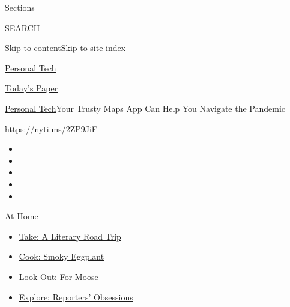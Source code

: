 Sections

SEARCH

\protect\hyperlink{site-content}{Skip to
content}\protect\hyperlink{site-index}{Skip to site index}

\href{https://www.nytimes3xbfgragh.onion/section/technology/personaltech}{Personal
Tech}

\href{https://myaccount.nytimes3xbfgragh.onion/auth/login?response_type=cookie\&client_id=vi}{}

\href{https://www.nytimes3xbfgragh.onion/section/todayspaper}{Today's
Paper}

\href{/section/technology/personaltech}{Personal Tech}\textbar{}Your
Trusty Maps App Can Help You Navigate the Pandemic

\url{https://nyti.ms/2ZP9JiF}

\begin{itemize}
\item
\item
\item
\item
\item
\end{itemize}

\href{https://www.nytimes3xbfgragh.onion/spotlight/at-home?action=click\&pgtype=Article\&state=default\&region=TOP_BANNER\&context=at_home_menu}{At
Home}

\begin{itemize}
\tightlist
\item
  \href{https://www.nytimes3xbfgragh.onion/2020/07/28/books/time-for-a-literary-road-trip.html?action=click\&pgtype=Article\&state=default\&region=TOP_BANNER\&context=at_home_menu}{Take:
  A Literary Road Trip}
\item
  \href{https://www.nytimes3xbfgragh.onion/2020/07/29/magazine/bored-with-your-home-cooking-some-smoky-eggplant-will-fix-that.html?action=click\&pgtype=Article\&state=default\&region=TOP_BANNER\&context=at_home_menu}{Cook:
  Smoky Eggplant}
\item
  \href{https://www.nytimes3xbfgragh.onion/2020/07/27/travel/moose-michigan-isle-royale.html?action=click\&pgtype=Article\&state=default\&region=TOP_BANNER\&context=at_home_menu}{Look
  Out: For Moose}
\item
  \href{https://www.nytimes3xbfgragh.onion/interactive/2020/at-home/even-more-reporters-editors-diaries-lists-recommendations.html?action=click\&pgtype=Article\&state=default\&region=TOP_BANNER\&context=at_home_menu}{Explore:
  Reporters' Obsessions}
\end{itemize}

